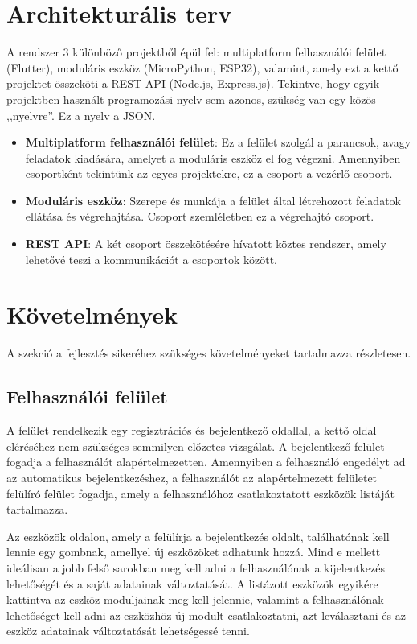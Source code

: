 \documentclass{thesis-ekf}
\theoremstyle{definition}
\theoremstyle{remark}
\begin{document}
	\section{Architekturális terv}
	A rendszer 3 különböző projektből épül fel: multiplatform felhasználói felület (Flutter), moduláris eszköz (MicroPython, ESP32), valamint, amely ezt a kettő projektet összeköti a REST API (Node.js, Express.js). Tekintve, hogy egyik projektben használt programozási nyelv sem azonos, szükség van egy közös ,,nyelvre''. Ez a nyelv a JSON.
	\begin{itemize}
		\item \textbf{Multiplatform felhasználói felület}: Ez a felület szolgál a parancsok, avagy feladatok kiadására, amelyet a moduláris eszköz el fog végezni. Amennyiben csoportként tekintünk az egyes projektekre, ez a csoport a vezérlő csoport.
		\item \textbf{Moduláris eszköz}: Szerepe és munkája a felület által létrehozott feladatok ellátása és végrehajtása. Csoport szemléletben ez a végrehajtó csoport.
		\item \textbf{REST API}: A két csoport összekötésére hívatott köztes rendszer, amely lehetővé teszi a kommunikációt a csoportok között.
	\end{itemize}
	\section{Követelmények}
	\label{sec_kovetelmenyek}
	A szekció a fejlesztés sikeréhez szükséges követelményeket tartalmazza részletesen.
	\subsection{Felhasználói felület}
	A felület rendelkezik egy regisztrációs és bejelentkező oldallal, a kettő oldal eléréséhez nem szükséges semmilyen előzetes vizsgálat. A bejelentkező felület fogadja a felhasználót alapértelmezetten.
	Amennyiben a felhasználó engedélyt ad az automatikus bejelentkezéshez, a felhasználót az alapértelmezett felületet felülíró felület fogadja, amely a felhasználóhoz csatlakoztatott eszközök listáját tartalmazza.
	
	Az eszközök oldalon, amely a felülírja a bejelentkezés oldalt, találhatónak kell lennie egy gombnak, amellyel új eszközöket adhatunk hozzá. Mind e mellett ideálisan a jobb felső sarokban meg kell adni a felhasználónak a kijelentkezés lehetőségét és a saját adatainak változtatását. A listázott eszközök egyikére kattintva az eszköz moduljainak meg kell jelennie, valamint a felhasználónak lehetőséget kell adni az eszközhöz új modult csatlakoztatni, azt leválasztani és az eszköz adatainak változtatását lehetségessé tenni.
	
\end{document}
